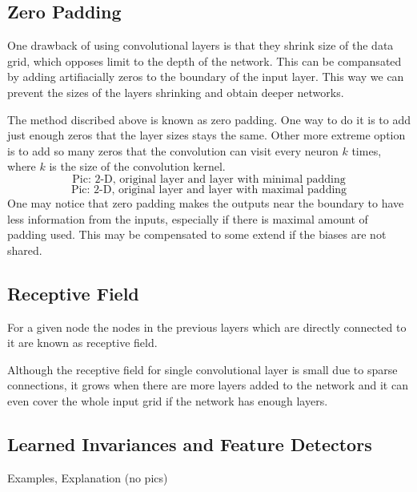 \documentclass[]{article}
\begin{document}
\subsection{Zero Padding}
One drawback of using convolutional layers is that they shrink size of the data
grid, which opposes limit to the depth of the network. This can be compansated by
adding artifiacially zeros to the boundary of the input layer. This way we can
prevent the sizes of the layers shrinking and obtain deeper networks.

The method discribed above is known as zero padding. One way to do it is to add
just enough zeros that the layer sizes stays the same. Other more extreme option
is to add so many zeros that the convolution can visit every neuron $k$ times,
where $k$ is the size of the convolution kernel.
\[
\text{Pic: 2-D, original layer and layer with minimal padding}
\]
\[
\text{Pic: 2-D, original layer and layer with maximal padding}
\]
One may notice that zero padding makes the outputs near the boundary to have less
information from the inputs, especially if there is maximal amount of padding
used. This may be compensated to some extend if the biases are not shared.

\subsection{Receptive Field}
For a given node the nodes in the previous layers which are directly connected
to it are known as receptive field.

Although the receptive field for single convolutional layer is small due to sparse
connections, it grows when there are more layers added to the network and it can
even cover the whole input grid if the network has enough layers.


\subsection{Learned Invariances and Feature Detectors}
Examples, Explanation (no pics)
\end{document}
